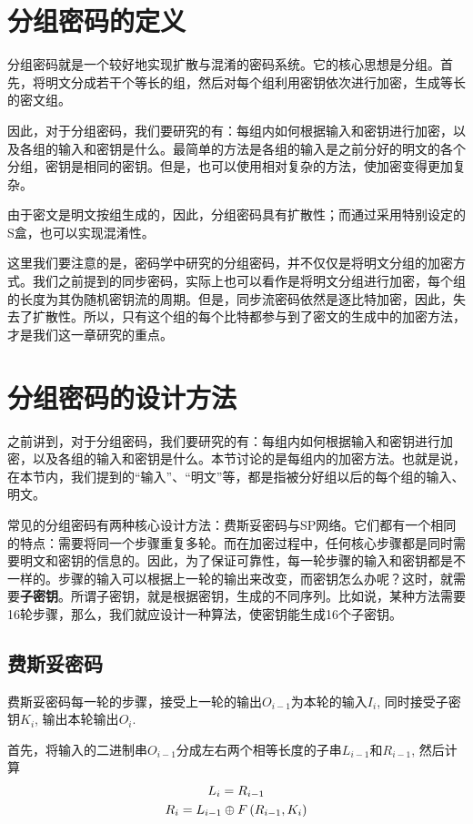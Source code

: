 \section{分组密码的定义}
分组密码就是一个较好地实现扩散与混淆的密码系统。它的核心思想是分组。首先，将明文分成若干个等长的组，然后对每个组利用密钥依次进行加密，生成等长的密文组。\par
因此，对于分组密码，我们要研究的有：每组内如何根据输入和密钥进行加密，以及各组的输入和密钥是什么。最简单的方法是各组的输入是之前分好的明文的各个分组，密钥是相同的密钥。但是，也可以使用相对复杂的方法，使加密变得更加复杂。\par
由于密文是明文按组生成的，因此，分组密码具有扩散性；而通过采用特别设定的S盒，也可以实现混淆性。\par
这里我们要注意的是，密码学中研究的分组密码，并不仅仅是将明文分组的加密方式。我们之前提到的同步密码，实际上也可以看作是将明文分组进行加密，每个组的长度为其伪随机密钥流的周期。但是，同步流密码依然是逐比特加密，因此，失去了扩散性。所以，只有这个组的每个比特都参与到了密文的生成中的加密方法，才是我们这一章研究的重点。
\section{分组密码的设计方法}
之前讲到，对于分组密码，我们要研究的有：每组内如何根据输入和密钥进行加密，以及各组的输入和密钥是什么。本节讨论的是每组内的加密方法。也就是说，在本节内，我们提到的“输入”、“明文”等，都是指被分好组以后的每个组的输入、明文。\par
常见的分组密码有两种核心设计方法：费斯妥密码与SP网络。它们都有一个相同的特点：需要将同一个步骤重复多轮。而在加密过程中，任何核心步骤都是同时需要明文和密钥的信息的。因此，为了保证可靠性，每一轮步骤的输入和密钥都是不一样的。步骤的输入可以根据上一轮的输出来改变，而密钥怎么办呢？这时，就需要\textbf{子密钥}。所谓子密钥，就是根据密钥，生成的不同序列。比如说，某种方法需要16轮步骤，那么，我们就应设计一种算法，使密钥能生成16个子密钥。
\subsection{费斯妥密码}
费斯妥密码每一轮的步骤，接受上一轮的输出$O_{i-1}$为本轮的输入$I_i$, 同时接受子密钥$K_i$, 输出本轮输出$O_i$.\par
首先，将输入的二进制串$O_{i-1}$分成左右两个相等长度的子串$L_{i-1}$和$R_{i-1}$, 然后计算
\begin{gather}
    L_{i}=R_{i-1}\\
    R_{i}=L_{i-1}\oplus F\left( {R_{i-1}, K_i}\right)
\end{gather}

